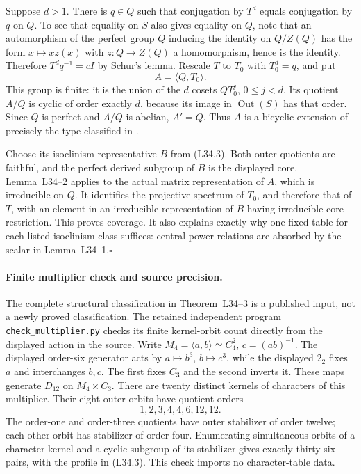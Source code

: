 Suppose $d>1$.  There is $q\in Q$ such that conjugation by $T^d$
equals conjugation by $q$ on $Q$.  To see that equality on $S$
also gives equality on $Q$, note that an automorphism of the
perfect group $Q$ inducing the identity on $Q/Z(Q)$ has the form
$x\mapsto xz(x)$ with $z:Q\to Z(Q)$ a homomorphism, hence is
the identity.  Therefore $T^dq^{-1}=cI$ by Schur's lemma.
Rescale $T$ to $T_0$ with $T_0^d=q$, and put
\[
                       A=\langle Q,T_0\rangle.
\]
This group is finite: it is the union of the $d$ cosets
$QT_0^j$, $0\leq j<d$.  Its quotient $A/Q$ is cyclic of order
exactly $d$, because its image in $\operatorname{Out}(S)$ has
that order.  Since $Q$ is perfect and $A/Q$ is abelian,
$A'=Q$.  Thus $A$ is a bicyclic extension of precisely the type
classified in \cite[Lemma~3.1]{D:BMO2017}.

Choose its isoclinism representative $B$ from (L34.3).
Both outer quotients are faithful, and the perfect derived subgroup
of $B$ is the displayed core.  Lemma~L34--2 applies to the actual
matrix representation of $A$, which is irreducible on $Q$.
It identifies the projective spectrum of $T_0$, and therefore that
of $T$, with an element in an irreducible representation of $B$
having irreducible core restriction.  This proves coverage.
It also explains exactly why one fixed table for each listed
isoclinism class suffices: central power relations are absorbed by
the scalar in Lemma~L34--1.\hfill$\square$

\paragraph{Finite multiplier check and source precision.}
The complete structural classification in Theorem~L34--3 is a
published input, not a newly proved classification.  The retained
independent program \texttt{check\_multiplier.py} checks its finite
kernel-orbit count directly from the displayed action in the source.
Write $M_4=\langle a,b\rangle\simeq C_4^2$, $c=(ab)^{-1}$.
The displayed order-six generator acts by
$a\mapsto b^3$, $b\mapsto c^3$, while the displayed $2_2$
fixes $a$ and interchanges $b,c$.  The first fixes $C_3$ and
the second inverts it.  These maps generate $D_{12}$ on
$M_4\times C_3$.
There are twenty distinct kernels of characters of this multiplier.
Their eight outer orbits have quotient orders
\[
              1,2,3,4,4,6,12,12.
\]
The order-one and order-three quotients have outer stabilizer of
order twelve; each other orbit has stabilizer of order four.
Enumerating simultaneous orbits of a character kernel and a cyclic
subgroup of its stabilizer gives exactly thirty-six pairs, with
the profile in (L34.3).  This check imports no character-table data.

